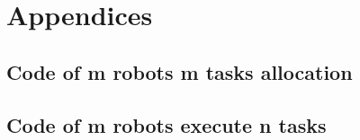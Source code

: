 \documentclass[a4paper]{article}
\begin{document}



\section{Appendices}
\subsection{Code of m robots m tasks allocation}
	

\subsection{Code of m robots execute n tasks}

\end{document}
